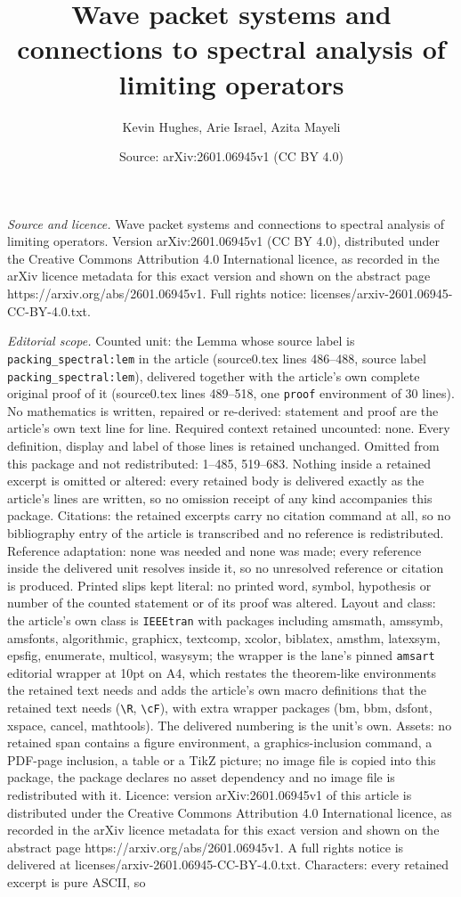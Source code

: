 \documentclass[10pt,a4paper]{amsart}
\title[Wave packet systems and connections to spectral analysis of ]{Wave packet systems and connections to spectral analysis of limiting operators}
\author{Kevin Hughes, Arie Israel, Azita Mayeli}
\date{Source: arXiv:2601.06945v1 (CC BY 4.0)}
\begin{document}
\maketitle

\noindent\emph{Source and licence.} Wave packet systems and connections to spectral analysis of limiting operators. Version arXiv:2601.06945v1 (CC BY 4.0), distributed under the Creative Commons Attribution 4.0 International licence, as recorded in the arXiv licence metadata for this exact version and shown on the abstract page https://arxiv.org/abs/2601.06945v1. Full rights notice: licenses/arxiv-2601.06945-CC-BY-4.0.txt.\par\smallskip

\noindent\textit{Editorial scope.} Counted unit: the Lemma whose source label is \texttt{packing\_spectral:lem} in the article (source0.tex lines 486--488, source label \texttt{packing\_spectral:lem}), delivered together with the article's own complete original proof of it (source0.tex lines 489--518, one \texttt{proof} environment of 30 lines). No mathematics is written, repaired or re-derived: statement and proof are the article's own text line for line. Required context retained uncounted: none. Every definition, display and label of those lines is retained unchanged. Omitted from this package and not redistributed: 1--485, 519--683. Nothing inside a retained excerpt is omitted or altered: every retained body is delivered exactly as the article's lines are written, so no omission receipt of any kind accompanies this package. Citations: the retained excerpts carry no citation command at all, so no bibliography entry of the article is transcribed and no reference is redistributed. Reference adaptation: none was needed and none was made; every reference inside the delivered unit resolves inside it, so no unresolved reference or citation is produced. Printed slips kept literal: no printed word, symbol, hypothesis or number of the counted statement or of its proof was altered. Layout and class: the article's own class is \texttt{IEEEtran} with packages including amsmath, amssymb, amsfonts, algorithmic, graphicx, textcomp, xcolor, biblatex, amsthm, latexsym, epsfig, enumerate, multicol, wasysym; the wrapper is the lane's pinned \texttt{amsart} editorial wrapper at 10pt on A4, which restates the theorem-like environments the retained text needs and adds the article's own macro definitions that the retained text needs (\texttt{\textbackslash R}, \texttt{\textbackslash cF}), with extra wrapper packages (bm, bbm, dsfont, xspace, cancel, mathtools). The delivered numbering is the unit's own. Assets: no retained span contains a figure environment, a graphics-inclusion command, a PDF-page inclusion, a table or a TikZ picture; no image file is copied into this package, the package declares no asset dependency and no image file is redistributed with it. Licence: version arXiv:2601.06945v1 of this article is distributed under the Creative Commons Attribution 4.0 International licence, as recorded in the arXiv licence metadata for this exact version and shown on the abstract page https://arxiv.org/abs/2601.06945v1. A full rights notice is delivered at licenses/arxiv-2601.06945-CC-BY-4.0.txt. Characters: every retained excerpt is pure ASCII, so 
\end{document}
